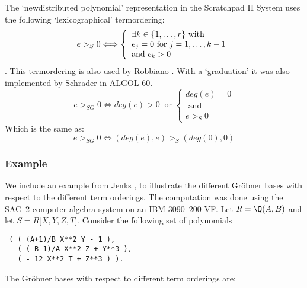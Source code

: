 The `newdistributed polynomial' representation in
the Scratchpad II System uses the
following `lexicographical' termordering:
\begin{displaymath}
 e >_S 0
 \Longleftrightarrow
   \left\{
   \begin{array}{l}
     \exists k \in \{1,\ldots,r\} \ {\rm with} \\
     e_j = 0 \ {\rm for} \ j=1,\ldots,k-1 \\
     {\rm and} \ e_k > 0
   \end{array}
   \right.
\end{displaymath}
\cite{Jenks 84}.
This termordering is also used by Robbiano 
\cite{Robbiano 85}.
With a `graduation' it was also implemented by Schrader 
\cite{Schrader 76}
in ALGOL 60.
\begin{displaymath}
 e >_{SG} 0
 \Longleftrightarrow
 deg(e) > 0 \ \mbox{ or }
   \left\{
   \begin{array}{l}
     deg(e) = 0 \\
     \mbox{ and } \\
     e >_S 0
   \end{array}
   \right.
\end{displaymath}
Which is the same as:
\begin{displaymath}
 e >_{SG} 0
 \Longleftrightarrow
 (deg(e),e) >_S (deg(0),0)
\end{displaymath}


\subsubsection{Example}

We include an example from Jenks 
\cite{Jenks 84}, to illustrate the different
Gr\"obner bases with respect to the different
term orderings.
The computation was done using the SAC--2 computer algebra system
on an IBM 3090--200 VF.
Let $R = \Q(A,B)$ and let $S = R\lbrack X, Y, Z, T \rbrack$.
Consider the following set of polynomials
\begin{verbatim}
 ( ( (A+1)/B X**2 Y - 1 ),
   ( (-B-1)/A X**2 Z + Y**3 ),
   ( - 12 X**2 T + Z**3 ) ).
\end{verbatim}

The Gr\"obner bases with respect to different term orderings are:

